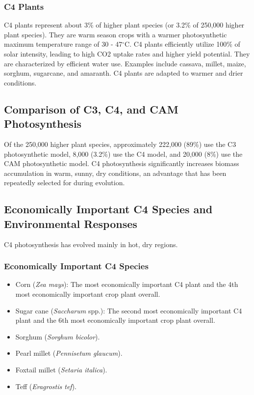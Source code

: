 \subsubsection{C4 Plants} 
C4 plants represent about 3\% of higher plant species (or 3.2\% of 250,000 higher plant species). They are warm season crops with a warmer photosynthetic maximum temperature range of 30 - 47$^{\circ}$C. C4 plants efficiently utilize 100\% of solar intensity, leading to high CO2 uptake rates and higher yield potential. They are characterized by efficient water use. Examples include cassava, millet, maize, sorghum, sugarcane, and amaranth. C4 plants are adapted to warmer and drier conditions.

\subsection{Comparison of C3, C4, and CAM Photosynthesis} 
Of the 250,000 higher plant species, approximately 222,000 (89\%) use the C3 photosynthetic model, 8,000 (3.2\%) use the C4 model, and 20,000 (8\%) use the CAM photosynthetic model. C4 photosynthesis significantly increases biomass accumulation in warm, sunny, dry conditions, an advantage that has been repeatedly selected for during evolution.

\subsection{Economically Important C4 Species and Environmental Responses} C4 photosynthesis has evolved mainly in hot, dry regions.

\subsubsection{Economically Important C4 Species} 
\begin{itemize} 
    \item Corn (\textit{Zea mays}): The most economically important C4 plant and the 4th most economically important crop plant overall. 
    \item Sugar cane (\textit{Saccharum} spp.): The second most economically important C4 plant and the 6th most economically important crop plant overall. 
    \item Sorghum (\textit{Sorghum bicolor}). 
    \item Pearl millet (\textit{Pennisetum glaucum}). 
    \item Foxtail millet (\textit{Setaria italica}). 
    \item Teff (\textit{Eragrostis tef}). 
\end{itemize}

